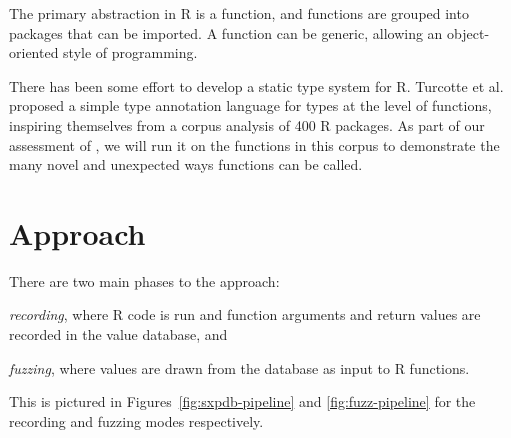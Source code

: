 \documentclass[sigplan,anonymous,review]{acmart}
\begin{document}
The primary abstraction in R is a function, and functions are grouped into packages that can be imported. 
A function can be generic, allowing an object-oriented style of programming. 

There has been some effort to develop a static type system for R.
Turcotte et al.~\cite{turcotte2020designing} proposed a simple type annotation language for types at the level of functions, inspiring themselves from a corpus analysis of 400 R packages.
As part of our assessment of \tool, we will run it on the functions in this corpus to demonstrate the many novel and unexpected ways functions can be called.




\section{Approach}
\label{sec:fuzzy}

There are two main phases to the approach:
%
\begin{inparaenum}[(1)]
\item \emph{recording}, where R code is run and function arguments and return values are recorded in the value database, and %
\item \emph{fuzzing}, where values are drawn from the database as input to R functions. 
\end{inparaenum}
%
This is pictured in Figures~\ref{fig:sxpdb-pipeline} and \ref{fig:fuzz-pipeline} for the recording and fuzzing modes respectively.
\end{document}
